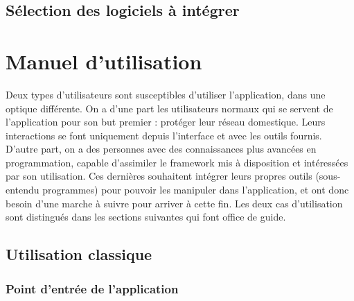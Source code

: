 \documentclass[]{article}
\begin{document}

\subsection{Sélection des logiciels à intégrer}


\newpage

\section{Manuel d'utilisation}

Deux types d'utilisateurs sont susceptibles d'utiliser l'application, dans une optique différente. On a d'une part les utilisateurs normaux qui se servent de l'application pour son but premier : protéger leur réseau domestique. Leurs interactions se font uniquement depuis l'interface et avec les outils fournis. D'autre part, on a des personnes avec des connaissances plus avancées en programmation, capable d'assimiler le framework mis à disposition et intéressées par son utilisation. Ces dernières souhaitent intégrer leurs propres outils (sous-entendu programmes) pour pouvoir les manipuler dans l'application, et ont donc besoin d'une marche à suivre pour arriver à cette fin. Les deux cas d'utilisation sont distingués dans les sections suivantes qui font office de guide.

\subsection{Utilisation classique}

\subsubsection{Point d'entrée de l'application}
\end{document}

